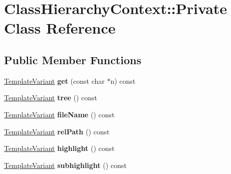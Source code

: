 \hypertarget{class_class_hierarchy_context_1_1_private}{}\section{Class\+Hierarchy\+Context\+::Private Class Reference}
\label{class_class_hierarchy_context_1_1_private}
\subsection*{Public Member Functions}
\begin{DoxyCompactItemize}
\item 
\mbox{\label{class_class_hierarchy_context_1_1_private_a52735d0b9d4bd1eb85f203a7ad942020}} 
\mbox{\hyperlink{class_template_variant}{Template\+Variant}} {\bfseries get} (const char $\ast$n) const
\item 
\mbox{\label{class_class_hierarchy_context_1_1_private_a4b37e28dd093f0e705af3bd9ef81bafb}} 
\mbox{\hyperlink{class_template_variant}{Template\+Variant}} {\bfseries tree} () const
\item 
\mbox{\label{class_class_hierarchy_context_1_1_private_ab9d57eeb3182e95cc5b1c3e1694445fe}} 
\mbox{\hyperlink{class_template_variant}{Template\+Variant}} {\bfseries file\+Name} () const
\item 
\mbox{\label{class_class_hierarchy_context_1_1_private_abd3eed6577b57381368bd805175eb5b0}} 
\mbox{\hyperlink{class_template_variant}{Template\+Variant}} {\bfseries rel\+Path} () const
\item 
\mbox{\label{class_class_hierarchy_context_1_1_private_a67d310dfb9da5b1ab9c64dec8ef509b1}} 
\mbox{\hyperlink{class_template_variant}{Template\+Variant}} {\bfseries highlight} () const
\item 
\mbox{\label{class_class_hierarchy_context_1_1_private_ac616ca249dae2892bf6226c2064d920b}} 
\mbox{\hyperlink{class_template_variant}{Template\+Variant}} {\bfseries subhighlight} () const
\item 

\end{DoxyCompactItemize}
